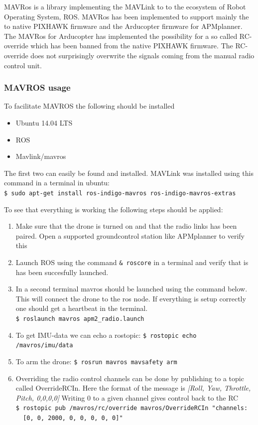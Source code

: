MAVRos is a library implementing the MAVLink to to the ecosystem of Robot Operating System, ROS.
MAVRos has been implemented to support mainly the to native PIXHAWK firmware and the Arducopter firmware for APMplanner.
The MAVRos for Arducopter has implemented the possibility for a so called RC-override which has been banned from the native PIXHAWK firmware. The RC-override does not surprisingly overwrite the signals coming from the manual radio control unit.

\subsubsection{MAVROS usage}
To facilitate MAVROS the following should be installed
\begin{itemize}
	\item Ubuntu 14.04 LTS
	\item ROS
	\item Mavlink/mavros
\end{itemize}

The first two can easily be found and installed. MAVLink was installed using this command in a terminal in ubuntu:\\
\verb|$ sudo apt-get install ros-indigo-mavros ros-indigo-mavros-extras|

To see that everything is working the following steps should be applied:
\begin{enumerate}
\item Make sure that the drone is turned on and that the radio links has been paired. Open a supported groundcontrol station like APMplanner to verify this 
\item Launch ROS using the command \verb|& roscore| in a terminal and verify that is has been succesfully launched.
\item In a second terminal mavros should be launched using the command below. This will connect the drone to the ros node. If everything is setup correctly one should get a heartbeat in the terminal.\\
\verb|$ roslaunch mavros apm2_radio.launch|
\item To get IMU-data we can echo a rostopic:
\verb|$ rostopic echo /mavros/imu/data|
\item To arm the drone:
\verb|$ rosrun mavros mavsafety arm|
\item Overriding the radio control channels can be done by publishing to a topic called OverrideRCIn. Here the format of the message is \emph{[Roll, Yaw, Throttle, Pitch, 0,0,0,0]} Writing 0 to a given channel gives control back to the RC\\
\verb|$ rostopic pub /mavros/rc/override mavros/OverrideRCIn "channels:|\\
\verb|  [0, 0, 2000, 0, 0, 0, 0, 0]"|
\end{enumerate}


